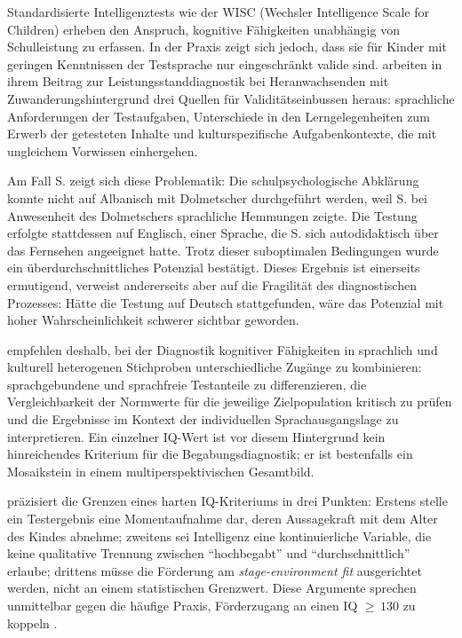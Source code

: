 \documentclass[ngerman, a4paper]{article}
\begin{document}
Standardisierte Intelligenztests wie der WISC (Wechsler Intelligence Scale
for Children) erheben den Anspruch, kognitive Fähigkeiten unabhängig von
Schulleistung zu erfassen. In der Praxis zeigt sich jedoch, dass sie für
Kinder mit geringen Kenntnissen der Testsprache nur eingeschränkt valide
sind. \textcite[S.\,152--165,\,187\,f.]{haag2018leistungsstanddiagnostik}
arbeiten in ihrem Beitrag zur Leistungsstanddiagnostik bei Heranwachsenden
mit Zuwanderungshintergrund drei Quellen für Validitätseinbussen heraus:
sprachliche Anforderungen der Testaufgaben, Unterschiede in den
Lerngelegenheiten zum Erwerb der getesteten Inhalte und kulturspezifische
Aufgabenkontexte, die mit ungleichem Vorwissen einhergehen.

Am Fall S. zeigt sich diese Problematik: Die schulpsychologische Abklärung
konnte nicht auf Albanisch mit Dolmetscher durchgeführt werden, weil S.
bei Anwesenheit des Dolmetschers sprachliche Hemmungen zeigte. Die Testung
erfolgte stattdessen auf Englisch, einer Sprache, die S. sich
autodidaktisch über das Fernsehen angeeignet hatte. Trotz dieser
suboptimalen Bedingungen wurde ein überdurchschnittliches Potenzial
bestätigt. Dieses Ergebnis ist einerseits ermutigend, verweist
andererseits aber auf die Fragilität des diagnostischen Prozesses: Hätte
die Testung auf Deutsch stattgefunden, wäre das Potenzial mit hoher
Wahrscheinlichkeit schwerer sichtbar geworden.

\textcite[S.\,158\,f.,\,163--165]{haag2018leistungsstanddiagnostik}
empfehlen deshalb, bei der Diagnostik kognitiver Fähigkeiten in
sprachlich und kulturell heterogenen Stichproben unterschiedliche
Zugänge zu kombinieren: sprachgebundene und sprachfreie Testanteile zu
differenzieren, die Vergleichbarkeit der Normwerte für die jeweilige
Zielpopulation kritisch zu prüfen und die Ergebnisse im Kontext der
individuellen Sprachausgangslage zu interpretieren. Ein einzelner
IQ-Wert ist vor diesem Hintergrund kein hinreichendes Kriterium für die
Begabungsdiagnostik; er ist bestenfalls ein Mosaikstein in einem
multiperspektivischen Gesamtbild.

\textcite[S.\,117]{baudson2021wasdenken} präzisiert die Grenzen eines harten
IQ-Kriteriums in drei Punkten: Erstens stelle ein Testergebnis eine Momentaufnahme
dar, deren Aussagekraft mit dem Alter des Kindes abnehme; zweitens sei Intelligenz
eine kontinuierliche Variable, die keine qualitative Trennung zwischen
\enquote{hochbegabt} und \enquote{durchschnittlich} erlaube; drittens müsse die
Förderung am \textit{stage-environment fit} ausgerichtet werden, nicht an einem
statistischen Grenzwert. Diese Argumente sprechen unmittelbar gegen die häufige
Praxis, Förderzugang an einen IQ ${\geq}\,130$ zu koppeln
\parencite[S.\,115]{baudson2021wasdenken}.
\end{document}
